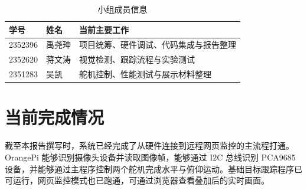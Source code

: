\begin{table}[htbp]
  \centering
  \caption{小组成员信息}
  \label{tab:members}
  \begin{tabular}{lll}
    \toprule
    学号 & 姓名 & 当前主要工作 \\
    \midrule
    2352396 & {\namefont 禹尧珅} & 项目统筹、硬件调试、代码集成与报告整理 \\
    2352620 & 蒋文涛 & 视觉检测、跟踪流程与实验测试 \\
    2351283 & 吴凯 & 舵机控制、性能测试与展示材料整理 \\
    \bottomrule
  \end{tabular}
\end{table}

\section{当前完成情况}

截至本报告撰写时，系统已经完成了从硬件连接到远程网页监控的主流程打通。OrangePi 能够识别摄像头设备并读取图像帧，能够通过 I2C 总线识别 PCA9685 设备，并能够通过主程序控制两个舵机完成水平与俯仰运动。基础目标跟踪程序已可运行，网页监控模式也已跑通，可通过浏览器查看叠加后的实时画面。
